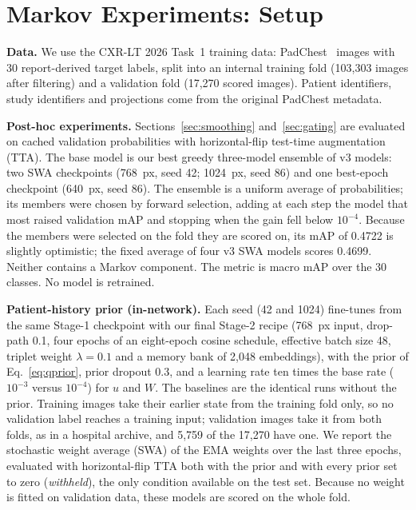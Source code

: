 \documentclass[conference]{IEEEtran}
\begin{document}
\section{Markov Experiments: Setup}
\label{s:mksetup}\label{sec:setup}
\textbf{Data.} We use the CXR-LT 2026 Task~1 training data: PadChest~\cite{b9} images with 30 report-derived target labels, split into an internal training fold (103,303 images after filtering) and a validation fold (17,270 scored images). Patient identifiers, study identifiers and projections come from the original PadChest metadata.

\textbf{Post-hoc experiments.} Sections~\ref{sec:smoothing} and~\ref{sec:gating} are evaluated on cached validation probabilities with horizontal-flip test-time augmentation (TTA). The base model is our best greedy three-model ensemble of v3 models: two SWA checkpoints (768~px, seed 42; 1024~px, seed 86) and one best-epoch checkpoint (640~px, seed 86). The ensemble is a uniform average of probabilities; its members were chosen by forward selection, adding at each step the model that most raised validation mAP and stopping when the gain fell below $10^{-4}$. Because the members were selected on the fold they are scored on, its mAP of 0.4722 is slightly optimistic; the fixed average of four v3 SWA models scores 0.4699. Neither contains a Markov component. The metric is macro mAP over the 30 classes. No model is retrained.

\textbf{Patient-history prior (in-network).} Each seed (42 and 1024) fine-tunes from the same Stage-1 checkpoint with our final Stage-2 recipe (768~px input, drop-path 0.1, four epochs of an eight-epoch cosine schedule, effective batch size 48, triplet weight $\lambda = 0.1$ and a memory bank of 2,048 embeddings), with the prior of Eq.~\eqref{eq:qprior}, prior dropout 0.3, and a learning rate ten times the base rate ($10^{-3}$ versus $10^{-4}$) for $u$ and $W$. The baselines are the identical runs without the prior. Training images take their earlier state from the training fold only, so no validation label reaches a training input; validation images take it from both folds, as in a hospital archive, and 5,759 of the 17,270 have one. We report the stochastic weight average (SWA) of the EMA weights over the last three epochs, evaluated with horizontal-flip TTA both with the prior and with every prior set to zero (\emph{withheld}), the only condition available on the test set. Because no weight is fitted on validation data, these models are scored on the whole fold.
\end{document}
